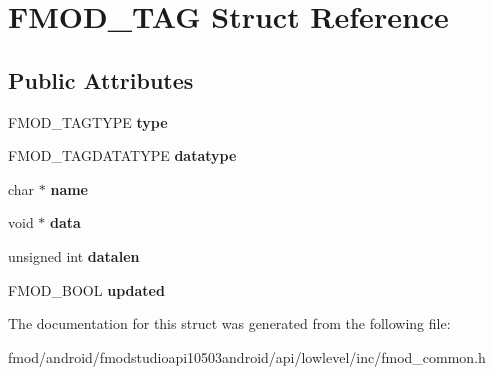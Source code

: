 \hypertarget{struct_f_m_o_d___t_a_g}{\section{F\+M\+O\+D\+\_\+\+T\+A\+G Struct Reference}
\label{struct_f_m_o_d___t_a_g}
}
\subsection*{Public Attributes}
\begin{DoxyCompactItemize}
\item 
\hypertarget{struct_f_m_o_d___t_a_g_ad891c5f78e72ffeebc0f39e34e5b1b20}{F\+M\+O\+D\+\_\+\+T\+A\+G\+T\+Y\+P\+E {\bfseries type}}\label{struct_f_m_o_d___t_a_g_ad891c5f78e72ffeebc0f39e34e5b1b20}

\item 
\hypertarget{struct_f_m_o_d___t_a_g_acc0f4bf92ee045d5828ba7eccc3c4c23}{F\+M\+O\+D\+\_\+\+T\+A\+G\+D\+A\+T\+A\+T\+Y\+P\+E {\bfseries datatype}}\label{struct_f_m_o_d___t_a_g_acc0f4bf92ee045d5828ba7eccc3c4c23}

\item 
\hypertarget{struct_f_m_o_d___t_a_g_a7190b11e70e3b20ebe9d14e33a63f175}{char $\ast$ {\bfseries name}}\label{struct_f_m_o_d___t_a_g_a7190b11e70e3b20ebe9d14e33a63f175}

\item 
\hypertarget{struct_f_m_o_d___t_a_g_a4bef041c500c9574daa3d435963470c0}{void $\ast$ {\bfseries data}}\label{struct_f_m_o_d___t_a_g_a4bef041c500c9574daa3d435963470c0}

\item 
\hypertarget{struct_f_m_o_d___t_a_g_a589281f4f1adc717798744722ec43761}{unsigned int {\bfseries datalen}}\label{struct_f_m_o_d___t_a_g_a589281f4f1adc717798744722ec43761}

\item 
\hypertarget{struct_f_m_o_d___t_a_g_a0358f4afc9957d3d3254691c3118d90a}{F\+M\+O\+D\+\_\+\+B\+O\+O\+L {\bfseries updated}}\label{struct_f_m_o_d___t_a_g_a0358f4afc9957d3d3254691c3118d90a}

\end{DoxyCompactItemize}


The documentation for this struct was generated from the following file\+:\begin{DoxyCompactItemize}
\item 
fmod/android/fmodstudioapi10503android/api/lowlevel/inc/fmod\+\_\+common.\+h\end{DoxyCompactItemize}
